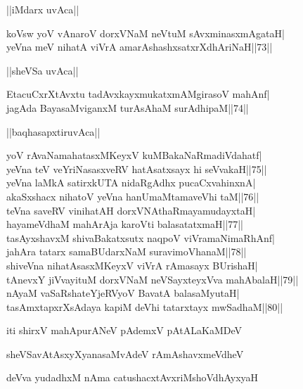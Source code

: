 \documentclass{article}
\begin{document}
\begin{center}
||iMdarx uvAca||
\end{center}

koVsw yoV vAnaroV dorxVNaM neVtuM sAvxminasxmAgataH|\\
yeVna meV nihatA viVrA amarAshashxsatxrXdhAriNaH||73||\\

\begin{center}
||sheVSa uvAca||
\end{center}

EtacuCxrXtAvxtu tadAvxkayxmukatxmAMgirasoV mahAnf|\\
jagAda BayasaMviganxM turAsAhaM surAdhipaM||74||\\

\begin{center}
||baqhasapxtiruvAca||
\end{center}

yoV rAvaNamahatasxMKeyxV kuMBakaNaRmadiVdahatf|\\
yeVna teV veYriNasasxveRV hatAsatxsayx hi seVvakaH||75||\\
yeVna laMkA satirxkUTA nidaRgAdhx pucaCxvahinxnA|\\
akaSxshacx nihatoV yeVna hanUmaMtamaveVhi taM||76||\\
teVna saveRV vinihatAH dorxVNAthaRmayamudayxtaH|\\
hayameVdhaM mahArAja karoVti balasatatxmaH||77||\\
tasAyxshavxM shivaBakatxsutx naqpoV viVramaNimaRhAnf|\\
ja{hA}ra tatarx samaBUdarxNaM suravimoVhanaM||78||\\
shiveVna nihatAsasxMKeyxV viVrA rAmasayx BUrishaH|\\
tAnevxY jiVvayituM dorxVNaM neVSayxteyxVva mahAbalaH||79||\\
nAyaM vaSaRshateYjeRVyoV BavatA balasaMyutaH|\\
tasAmxtapxrXsAdaya kapiM deVhi tatarxtayx mwSadhaM||80||

\begin{center}
iti shirxV mahApurANeV pAdemxV pAtALaKaMDeV
\end{center}

\begin{center}
sheVSavAtAsxyXyanasaMvAdeV rAmAshavxmeVdheV
\end{center}

\begin{center}
deVva yudadhxM nAma catushacxtAvxriMshoVdhAyxyaH
\end{center}
\end{document}
